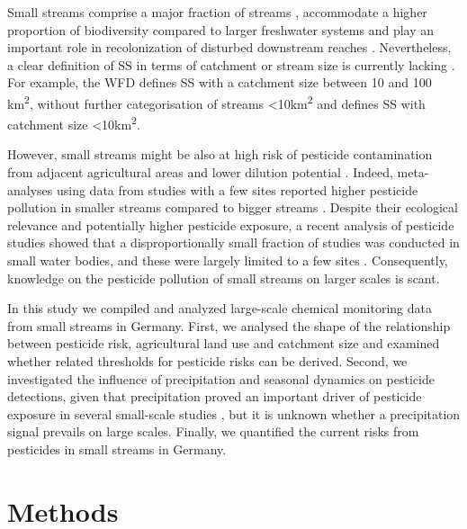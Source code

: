 \documentclass[journal=esthag,manuscript=article]{achemso}
\begin{document}
Small streams comprise a major fraction of streams \citep{nadeau_hydrological_2007}, accommodate a higher proportion of biodiversity compared to larger freshwater systems \citep{davies_comparison_2008, biggs_report_2014} and play an important role in recolonization of disturbed downstream reaches \citep{liess_analyzing_2005, orlinskiy_forested_2015}.
Nevertheless, a clear definition of SS in terms of catchment or stream size is currently lacking \citep{lorenz_specifics_2016}. 
For example, the WFD defines SS with a catchment size between 10 and 100 km\textsuperscript{2}, without further categorisation of streams \textless 10km\textsuperscript{2} and \citet{lorenz_specifics_2016} defines SS with catchment size \textless 10km\textsuperscript{2}. 

However, small streams might be also at high risk of pesticide contamination from adjacent agricultural areas and lower dilution potential \citep{schulz_field_2004,liess_determination_1999}.
Indeed, meta-analyses using data from studies with a few sites reported higher pesticide pollution in smaller streams compared to bigger streams \citep{stehle_pesticide_2015,schulz_field_2004}.
Despite their ecological relevance and potentially higher pesticide exposure, a recent analysis of pesticide studies showed that a disproportionally small fraction of studies was conducted in small water bodies, and these were largely limited to a few sites \citep{lorenz_specifics_2016}. 
Consequently, knowledge on the pesticide pollution of small streams on larger scales is scant.

In this study we compiled and analyzed large-scale chemical monitoring data from small streams in Germany. 
First, we analysed the shape of the relationship between pesticide risk, agricultural land use and catchment size and examined whether related thresholds for pesticide risks can be derived. 
Second, we investigated the influence of precipitation and seasonal dynamics on pesticide detections, given that precipitation proved an important driver of pesticide exposure in several small-scale studies \citep{wittmer_significance_2010}\citep{schulz_field_2004}, but it is unknown whether a precipitation signal prevails on large scales. 
Finally, we quantified the current risks from pesticides in small streams in Germany.



\section{Methods}
\end{document}

